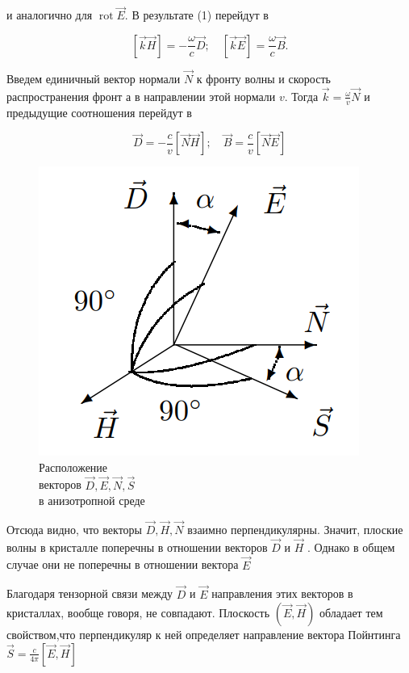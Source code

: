 \documentclass[a4paper,12pt]{article}
\begin{document}
и аналогично для $\operatorname{rot} \vec{E}$. В результате (1) перейдут в

\[
[\vec{k} \vec{H}]=-\frac{\omega}{c} \vec{D} ; \quad[\vec{k} \vec{E}]=\frac{\omega}{c} \vec{B} .
\]

\newpage

Введем единичный вектор нормали
$\vec{N}$ к фронту волны и скорость распространения фронт а в направлении этой нормали $v$. Тогда $\vec{k}= \frac{\omega}{v} \vec{N}$ и предыдущие соотношения перейдут в

\begin{equation}
\vec{D}=-\frac{c}{v}[\vec{N} \vec{H}] ; \quad \vec{B}=\frac{c}{v}[\vec{N} \vec{E}]
\end{equation}

\begin{figure} 
	\includegraphics[width=\linewidth]{fig1}
	\caption{Расположение \\ векторов $\vec{D} ,\vec{E}, \vec{N} , \vec{S}$ \\ в анизотропной среде}
\end{figure}

Отсюда видно, что векторы $\vec{D} , \vec{H} , \vec{N}$ взаимно перпендикулярны. Значит, плоские волны в кристалле поперечны в отношении векторов $\vec{D}$ и $\vec{H}$ . Однако в общем случае они не поперечны в отношении вектора $\vec{E}$

Благодаря тензорной связи между $\vec{D}$ и $\vec{E}$ направления этих векторов в кристаллах, вообще говоря, не совпадают. Плоскость $(\vec{E}, \vec{H})$ обладает тем свойством,что перпендикуляр к ней определяет направление вектора Пойнтинга  \\ $\vec{S} = \frac{c}{4 \pi} \left[ \vec{E}, \vec{H} \right]$
\end{document}
